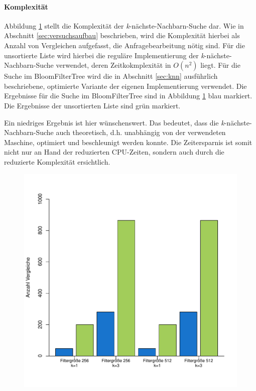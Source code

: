 \paragraph*{Komplexität}
Abbildung \ref{fig:pic19} stellt die Komplexität der \textit{k}-nächste-Nachbarn-Suche dar. Wie in Abschnitt \ref{sec:versuchsaufbau} beschrieben, wird die Komplexität hierbei als Anzahl von \mbox{Vergleichen} aufgefasst, die Anfragebearbeitung nötig sind. Für die unsortierte Liste wird hierbei die reguläre Implementierung der \textit{k}-nächste-Nachbarn-Suche verwendet, deren Zeitkokmplexität in $O(n^2)$ liegt. Für die Suche im BloomFilterTree wird die in Abschnitt \ref{sec:knn} ausführlich beschriebene, optimierte Variante der eigenen Implementierung verwendet. Die Ergebnisse für die Suche im BloomFilterTree sind in Abbildung \ref{fig:pic19} blau markiert. Die Ergebnisse der unsortierten Liste sind grün markiert.

Ein niedriges Ergebnis ist hier wünschenswert. Das bedeutet, dass die \textit{k}-nächste-Nach\-barn-Suche auch theoretisch, d.h. unabhängig von der verwendeten Maschine, optimiert und beschleunigt werden konnte. Die Zeitersparnis ist somit nicht nur an Hand der reduzierten CPU-Zeiten, sondern auch durch die reduzierte Komplexität ersichtlich. 
\begin{figure}[hptb]
	\centering
	\label{fig:pic19}
	\includegraphics[scale=0.7]{pictures/compl.pdf}
\end{figure}
\newpage
